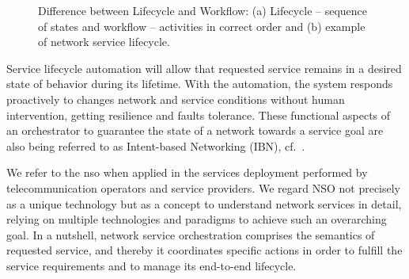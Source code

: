 \begin{figure}[thpb]
\centering
 \caption{Difference between Lifecycle and Workflow: (a) Lifecycle -- sequence of states and workflow -- activities in correct order and (b) example of network service lifecycle.}
 \label{fig:lifeworkflow}  
\end{figure}

Service lifecycle automation will allow that requested service remains in a desired state of behavior during its lifetime. With the automation, the system responds proactively to changes network and service conditions without human intervention, getting resilience and faults tolerance. These functional aspects of an orchestrator to guarantee the state of a network towards a service goal are also being referred to as Intent-based Networking (IBN), cf.~\cite{ibn}.

We refer to the \acrfull{nso} when applied in the services deployment performed by telecommunication operators and service providers. We regard NSO not precisely as a unique technology but as a concept to  understand network services in detail, relying on multiple technologies and paradigms to achieve such an overarching goal. In a nutshell, network service orchestration comprises the semantics of requested service, and thereby it coordinates specific actions in order to fulfill the service requirements and to manage its end-to-end lifecycle. 

